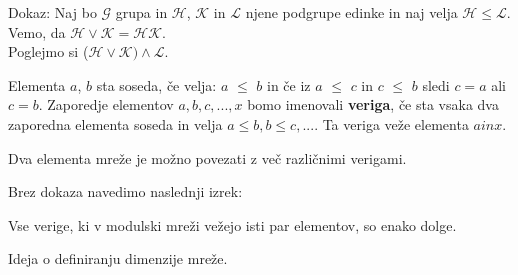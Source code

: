 \documentclass[slovene]{beamer}
\begin{document}
\begin{frame}
\begin{block}{Dokaz:}
Naj bo $\mathcal{G}$ grupa in $\mathcal{H}$, $\mathcal{K}$ in $\mathcal{L}$ njene podgrupe edinke in naj velja $\mathcal{H} \leq \mathcal{L}$. Vemo, da $\mathcal{H} \lor \mathcal{K} =\mathcal{H}\mathcal{K}.$\\
Poglejmo si ($\mathcal{H} \lor \mathcal{K}) \land \mathcal{L}$.
\end{block}
\end{frame}

\begin{frame}
\begin{definition}
Elementa $a$, $b$ sta soseda, če velja: $a$ $\leq$ $b$ in če iz $a$ $\leq$ $c$ in $c$ $\leq$ $b$ sledi $c = a$ ali $c = b$.
Zaporedje elementov $a, b, c, ..., x$ bomo imenovali \textbf{veriga}, če sta vsaka dva zaporedna elementa soseda in velja $a \leq b, b \leq c, ...$. Ta veriga veže elementa $a in x.$
\end{definition}
\begin{block}{}
Dva elementa mreže je možno povezati z več različnimi verigami.
\end{block}
\end{frame}

\begin{frame}
\begin{block}{}
Brez dokaza navedimo naslednji izrek:
\end{block}
\begin{theorem}
Vse verige, ki v modulski mreži vežejo isti par elementov, so enako dolge.
\end{theorem}
\begin{block}{}
Ideja o definiranju dimenzije mreže.
\end{block}
\end{frame}
\end{document}
